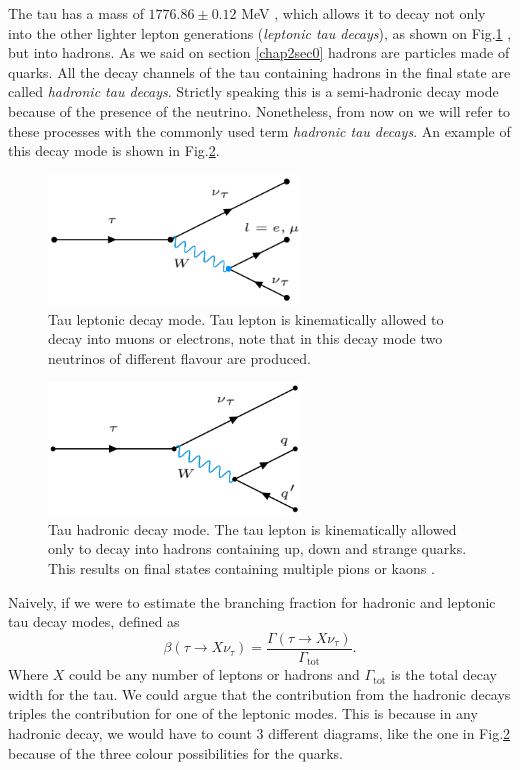 The tau has a mass of $1776.86 \pm 0.12$ MeV \cite{PhysRevD.98.030001}, which allows it to decay not only into the other lighter lepton generations (\textit{leptonic tau decays}), as shown on Fig.\ref{Fig1}  , but into hadrons. As we said on section \ref{chap2sec0} hadrons are particles made of quarks. All the decay channels of the tau containing hadrons in the final state are called \textit{hadronic tau decays}. Strictly speaking this is a semi-hadronic decay mode because of the presence of the neutrino. Nonetheless, from now on we will refer to these processes with the commonly used term \textit{hadronic tau decays}. An example of this decay mode is shown in Fig.\ref{Fig2}.
\begin{figure}[h]
	\centering
	\includegraphics[width=0.6\textwidth]{figures/Fig1}
	\caption{Tau leptonic decay mode. Tau lepton is kinematically allowed to decay into muons or electrons, note that in this decay mode two neutrinos of different flavour are produced.}
	\label{Fig1}
\end{figure}
\begin{figure}[h]
	\centering
	\includegraphics[width=0.6\textwidth]{figures/Fig2}
	\caption{Tau hadronic decay mode. The tau lepton is kinematically allowed only to decay into hadrons containing up, down and strange quarks. This results on final states containing multiple pions or kaons \cite{Davier_2006}.}
	\label{Fig2}
\end{figure}
Naively, if we were to estimate the branching fraction for hadronic and leptonic tau decay modes, defined as
\begin{equation}
	\beta(\tau\to X\nu_\tau)=\frac{\Gamma(\tau\to X\nu_\tau)}{\Gamma_{\text{tot}}}.
\end{equation}
Where $X$ could be any number of leptons or hadrons and $\Gamma_{\text{tot}}$ is the total decay width for the tau. We could argue that the contribution from the hadronic decays triples the contribution for one of the leptonic modes. This is because in any hadronic decay, we would have to count 3 different diagrams, like the one in Fig.\ref{Fig2} because of the three colour possibilities for the quarks.

